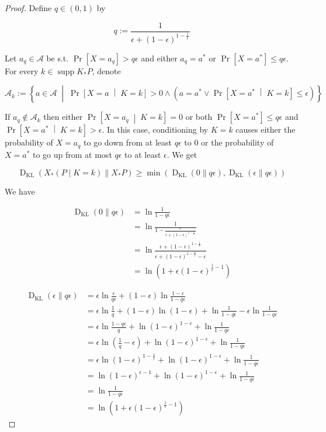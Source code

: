 \documentclass[anon,12pt]{colt2018} %
\DeclareMathOperator{\Supp}{supp}
\newcommand{\AP}[1]{\left(#1\right)}
\newcommand{\AB}[1]{\left[#1\right]}
\newcommand{\ABM}[2]{\left[#1\;\middle\vert\;#2\right]}
\newcommand{\ACM}[2]{\left\{#1\;\middle\vert\;#2\right\}}
\newcommand{\Pa}[2]{\underset{#1}{\operatorname{Pr}}\AB{#2}}
\newcommand{\CP}[3]{\underset{#1}{\operatorname{Pr}}\ABM{#2}{#3}}
\newcommand{\KL}[2]{\operatorname{D}_{\mathrm{KL}}(#1 \| #2)}
\newcommand{\A}{\mathcal{A}}
\begin{document}
\begin{proof}

Define $q \in (0,1)$ by

$$q:=\frac{1}{\epsilon+(1-\epsilon)^{1-\frac{1}{\epsilon}}}$$

Let $a_q \in \A$ be s.t. $\Pa{}{X=a_q} > q\epsilon$ and either $a_q = a^*$ or $\Pa{}{X=a^*} \leq q\epsilon$. For every $k \in \Supp{K_*P}$, denote

$$\A_k := \ACM{a \in \A}{\CP{}{X=a}{K=k} > 0 \land \AP{a = a^* \lor \CP{}{X=a^*}{K=k} \leq \epsilon}}$$

If $a_q \not\in \A_k$ then either $\CP{}{X=a_q}{K=k}=0$ or both $\Pa{}{X=a^*}\leq q\epsilon$ and\\ $\CP{}{X=a^*}{K=k} > \epsilon$. In this case, conditioning by $K = k$ causes either the probability of $X = a_q$ to go down from at least $q\epsilon$ to $0$ or the probability of $X = a^*$ to go up from at most $q\epsilon$ to at least $\epsilon$. We get

$$\KL{X_*(P \mid K = k)}{X_* P} \geq \min\AP{\KL{0}{q\epsilon},\KL{\epsilon}{q\epsilon}}$$

We have

\begin{align*}
\KL{0}{q\epsilon} &= \ln{\frac{1}{1-q\epsilon}}\\
&=\ln{\frac{1}{1-\frac{\epsilon}{\epsilon+(1-\epsilon)^{1-\frac{1}{\epsilon}}}}}\\
&=\ln{\frac{\epsilon+(1-\epsilon)^{1-\frac{1}{\epsilon}}}{\epsilon+(1-\epsilon)^{1-\frac{1}{\epsilon}}-\epsilon}}\\ &=\ln{\AP{1+\epsilon(1-\epsilon)^{\frac{1}{\epsilon}-1}}} 
\end{align*}

\begin{align*}
\KL{\epsilon}{q\epsilon} &= \epsilon \ln{\frac{\epsilon}{q\epsilon }}+(1-\epsilon)\ln{\frac{1-\epsilon}{1-q\epsilon}}\\
&= \epsilon \ln{\frac{1}{q}}+(1-\epsilon)\ln{(1-\epsilon)} +\ln{\frac{1}{1-q\epsilon}}- \epsilon \ln{\frac{1}{1-q\epsilon}}\\
&= \epsilon \ln{\frac{1-q\epsilon}{q}}+\ln{(1-\epsilon)^{1-\epsilon}} +\ln{\frac{1}{1-q\epsilon}}\\
&= \epsilon \ln{\AP{\frac{1}{q}-\epsilon}}+\ln{(1-\epsilon)^{1-\epsilon}} +\ln{\frac{1}{1-q\epsilon}}\\
&= \epsilon \ln{(1-\epsilon)^{1-\frac{1}{\epsilon}}}+\ln{(1-\epsilon)^{1-\epsilon}} +\ln{\frac{1}{1-q\epsilon}}\\
&= \ln{(1-\epsilon)^{\epsilon-1}}+\ln{(1-\epsilon)^{1-\epsilon}} +\ln{\frac{1}{1-q\epsilon}}\\
&=\ln{\frac{1}{1-q\epsilon}}\\
&=\ln{\AP{1+\epsilon(1-\epsilon)^{\frac{1}{\epsilon}-1}}}
\end{align*}


\end{proof}
\end{document}
